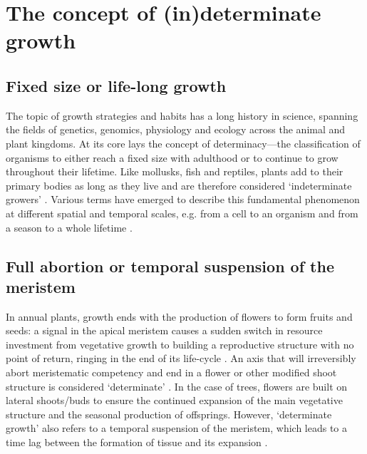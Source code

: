 \documentclass{article}
\begin{document}
	
\section*{The concept of (in)determinate growth}
	\subsection*{Fixed size or life-long growth} %
	The topic of growth strategies and habits has a long history in science, spanning the fields of genetics, genomics, physiology and ecology across the animal and plant kingdoms. At its core lays the concept of determinacy---the classification of organisms to either reach a fixed size with adulthood or to continue to grow throughout their lifetime. Like mollusks, fish and reptiles, plants add to their primary bodies as long as they live and are therefore considered `indeterminate growers' \citep{ejsmondHowTimeGrowth2010}. Various terms have emerged to describe this fundamental phenomenon at different spatial and temporal scales, e.g. from a cell to an organism and from a season to a whole lifetime \citep{mcdanielInductionDeterminationDevelopmental1992a, karkachTrajectoriesModelsIndividual2006}. \\

	\subsection*{Full abortion or temporal suspension of the meristem}
	In annual plants, growth ends with the production of flowers to form fruits and seeds: a signal in the apical meristem causes a sudden switch in resource investment from vegetative growth to building a reproductive structure with no point of return, ringing in the end of its life-cycle \citep{poethigPhaseChangeRegulation2003, huijserControlDevelopmentalPhase2011}. An axis that will irreversibly abort meristematic competency and end in a flower or other modified shoot structure is considered `determinate' \citep{barthelemyPlantArchitectureDynamic2007}. In the case of trees, flowers are built on lateral shoots/buds to ensure the continued expansion of the main vegetative structure and the seasonal production of offsprings. However, `determinate growth' also refers to a temporal suspension of the meristem, which leads to a time lag between the formation of tissue and its expansion \citep{kozlowskiSeedGerminationOntogeny2012, halleTropicalTreesForests1978}. 
	
\end{document}
